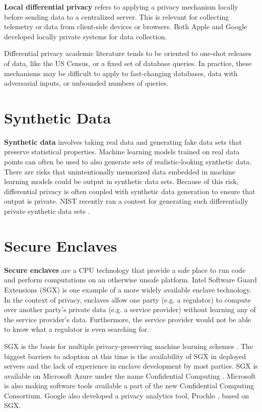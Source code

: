 \documentclass[nobib]{tufte-handout}
\begin{document}
\textbf{Local differential privacy} refers to applying a privacy mechanism
locally before sending data to a centralized server. This is relevant for
collecting telemetry or data from client-side devices or browsers. Both Apple
\cite{apple-local-differential-privacy} and Google \cite{erlingsson2014rappor}
developed locally private systems for data collection.

Differential privacy academic literature tends to be oriented to one-shot
releases of data, like the US Census, or a fixed set of database queries. In
practice, these mechanisms may be difficult to apply to fast-changing databases,
data with adversarial inputs, or unbounded numbers of queries.

\section{Synthetic Data}

\textbf{Synthetic data} involves taking real data and generating fake data sets
that preserve statistical properties. Machine learning models trained on real
data points can often be used to also generate sets of realistic-looking
synthetic data. There are risks that unintentionally memorized data
\cite{DBLP:journals/corr/abs-1802-08232} embedded in machine learning models
could be output in synthetic data sets. Because of this risk, differential
privacy is often coupled with synthetic data generation to ensure that output is
private. NIST recently ran a contest for generating such differentially private
synthetic data sets \cite{nist-synthetic-data}.

\section{Secure Enclaves}

\textbf{Secure enclaves} are a CPU technology that provide a safe place to run
code and perform computations on an otherwise unsafe platform. Intel Software
Guard Extensions (SGX) \cite{intel-sgx} is one example of a more widely
available enclave technology. In the context of privacy, enclaves allow one
party (e.g. a regulator) to compute over another party’s private data (e.g. a
service provider) without learning any of the service provider’s data.
Furthermore, the service provider would not be able to know what a regulator is
even searching for.

SGX is the basis for multiple privacy-preserving machine learning schemes
\cite{DBLP:conf/eurosp/ChengZKHHJJ0S19,tramer2018slalom,DBLP:journals/corr/abs-1803-05961}.
The biggest barriers to adoption at this time is the availability of SGX in
deployed servers and the lack of experience in enclave development by most
parties. SGX is available on Microsoft Azure under the name Confidential
Computing \cite{azure-confidential-computing}.  Microsoft is also making
software tools available a part of the new Confidential Computing Consortium.
Google also developed a privacy analytics tool, Prochlo \cite{prochlo}, based on
SGX.
\end{document}
